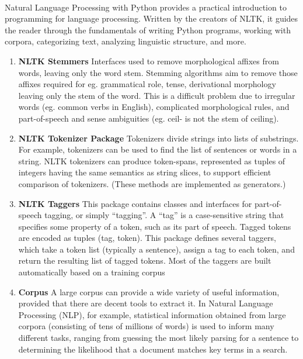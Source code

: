 \paragraph{} Natural Language Processing with Python provides a practical introduction to programming for language processing. Written by the creators of NLTK, it guides the reader through the fundamentals of writing Python programs, working with corpora, categorizing text, analyzing linguistic structure, and more.

\begin{enumerate}[1. ]
\item \textbf{NLTK Stemmers} \newline Interfaces used to remove morphological affixes from words, leaving only the word stem. Stemming algorithms aim to remove those affixes required for eg. grammatical role, tense, derivational morphology leaving only the stem of the word. This is a difficult problem due to irregular words (eg. common verbs in English), complicated morphological rules, and part-of-speech and sense ambiguities (eg. ceil- is not the stem of ceiling).
\item \textbf{NLTK Tokenizer Package} \newline Tokenizers divide strings into lists of substrings. For example, tokenizers can be used to find the list of sentences or words in a string. NLTK tokenizers can produce token-spans, represented as tuples of integers having the same semantics as string slices, to support efficient comparison of tokenizers. (These methods are implemented as generators.)
\item \textbf{NLTK Taggers} \newline This package contains classes and interfaces for part-of-speech tagging, or simply “tagging”. A “tag” is a case-sensitive string that specifies some property of a token, such as its part of speech. Tagged tokens are encoded as tuples (tag, token). This package defines several taggers, which take a token list (typically a sentence), assign a tag to each token, and return the resulting list of tagged tokens. Most of the taggers are built automatically based on a training corpus
\item \textbf{Corpus} \newline A large corpus can provide a wide variety of useful information, provided that there are decent tools to extract it. In Natural Language Processing (NLP), for example, statistical information obtained from large corpora (consisting of tens of millions of words) is used to inform many different tasks, ranging from guessing the most likely parsing for a sentence to determining the likelihood that a document matches key terms in a search.
\end{enumerate}
